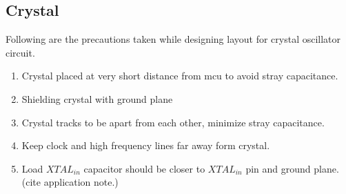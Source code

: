 \subsection{Crystal}
	Following are the precautions taken while designing layout for crystal oscillator circuit.
	\begin{enumerate}
		\item Crystal placed at very short distance from \gls{mcu} to avoid stray capacitance.
		\item Shielding crystal with ground plane
		\item Crystal tracks to be apart from each other, minimize stray capacitance.
		\item Keep clock and high frequency lines far away form crystal.
		\item Load $XTAL_{in}$ capacitor should be closer to $XTAL_{in}$ pin and ground plane.(cite application note.)
	\end{enumerate}
	

	
	
	